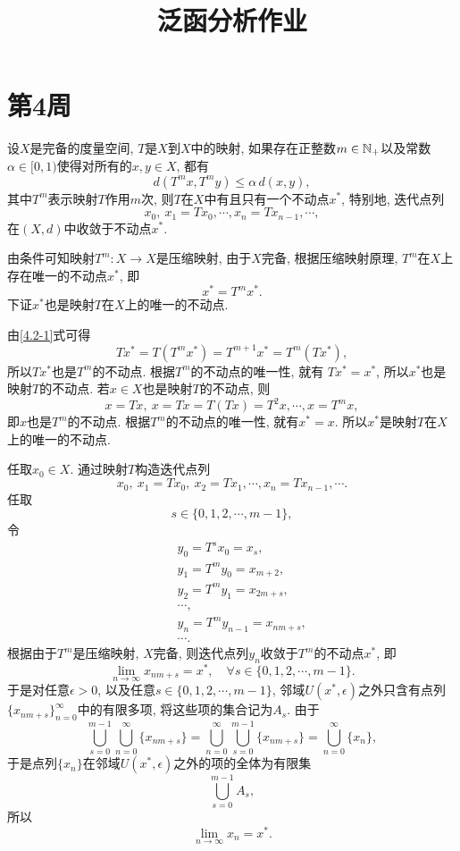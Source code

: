 \documentclass[UTF8,oneside,12pt]{article}  %
\makeatletter
\theoremstyle{DingLi1}
\numberwithin{equation}{section}
\theoremstyle{DingLi2}
\newtheorem{example}{\hskip 2em 问题}[section]
\renewenvironment{proof}[1][\proofname]{\par%
\pushQED{\qed}%
\normalfont \topsep6\p@\@plus6\p@\relax%
\trivlist%
\item[\hskip\labelsep%
#1]\ignorespaces%
}{%
\popQED\endtrivlist\@endpefalse%
}
\renewcommand{\proofname}{\heiti\large\color{blue} 证明}%
\makeatother
\begin{document}
\title{ 泛函分析作业}
\author{}
\date{}
\maketitle

\section{第4周}
\begin{example}
设$X$是完备的度量空间, $T$是$X$到$X$中的映射, 如果存在正整数$m\in \Bbb{N}_+$以及常数     $\alpha \in [0,1)$使得对所有的$x,y\in X$, 都有
$$d(T^m x, T^m y)\leq \alpha \,d(x,y),$$
其中$T^m$表示映射$T$作用$m$次, 则$T$在$X$中有且只有一个不动点$x^*$, 特别地, 迭代点列
$$x_0,\ x_1=Tx_0,\cdots,x_n=Tx_{n-1},\cdots,$$
在$(X,d)$中收敛于不动点$x^*$.
\end{example}
\begin{proof}
由条件可知映射$T^m:X\to X$是压缩映射, 由于$X$完备, 根据压缩映射原理, $T^m$在$X$上存在唯一的不动点$x^*$, 即
\begin{equation}\label{4.2-1}
x^*=T^m x^*.
\end{equation}
下证$x^*$也是映射$T$在$X$上的唯一的不动点.

由\eqref{4.2-1}式可得
$$T x^* =T\left(T^m x^*\right)=T^{m+1} x^*=T^m \left(T x^*\right),$$
所以$T x^*$也是$T^m$的不动点. 根据$T^m$的不动点的唯一性, 就有
$T x^*=x^*$, 所以$x^*$也是映射$T$的不动点. 若$x\in X$也是映射$T$的不动点, 则
$$x=Tx, \ x=Tx=T(Tx)=T^2 x,\cdots, x=T^m x,$$
即$x$也是$T^m$的不动点. 根据$T^m$的不动点的唯一性, 就有$x^*=x$. 所以$x^*$是映射$T$在$X$上的唯一的不动点.

任取$x_0\in X$. 通过映射$T$构造迭代点列
$$x_0, \ x_1=Tx_0,\ x_2=Tx_1,\cdots,x_n=T x_{n-1},\cdots.$$
任取
$$s\in \{0,1,2,\cdots,m-1\},$$
令
\begin{eqnarray*}
  &&y_0= T^s x_0=x_s, \\
  &&y_1=T^m y_0=x_{m+2},\\
  &&y_2=T^m y_1=x_{2m+s},\\
  &&\cdots,\\
  &&y_n=T^m y_{n-1}=x_{nm+s},\\
  &&\cdots.
\end{eqnarray*}
根据由于$T^m$是压缩映射, $X$完备, 则迭代点列$y_n$收敛于$T^m$的不动点$x^*$, 即
$$\lim_{n\to \infty}x_{nm+s} = x^*,\quad \forall s \in \{0,1,2,\cdots,m-1\}.$$
于是对任意$\epsilon>0$, 以及任意$s\in \{ 0,1,2,\cdots,m-1\}$, 邻域$U\left(x^*,\epsilon\right)$之外只含有点列$\{x_{nm+s}\}_{n=0}^\infty$中的有限多项, 将这些项的集合记为$A_s$. 由于
$$ \bigcup_{s=0}^{m-1}\bigcup_{n=0}^\infty \{x_{nm+s}\}=\bigcup_{n=0}^\infty \bigcup_{s=0}^{m-1} \{x_{nm+s}\}=\bigcup_{n=0}^\infty\{x_n\},$$
于是点列$\{x_n\}$在邻域$U\left(x^*,\epsilon\right)$之外的项的全体为有限集
$$\bigcup_{s=0}^{m-1}A_s,$$
所以
$$\lim_{n\to \infty}x_n =x^*.$$
\end{proof}
\end{document}
